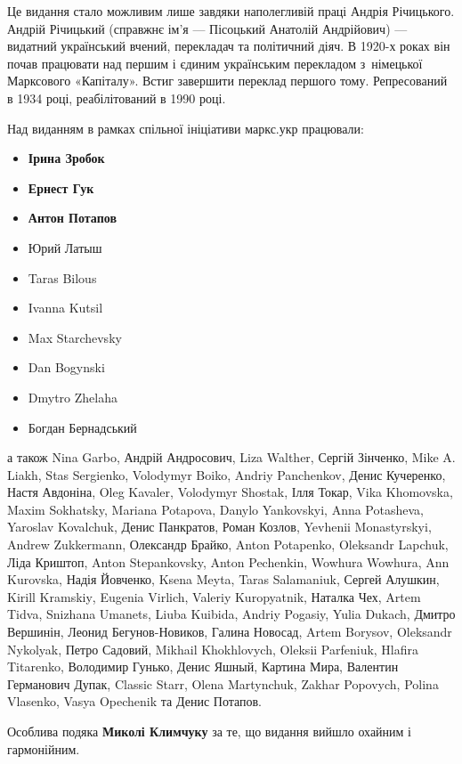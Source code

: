 
Це видання стало можливим лише завдяки наполегливій праці Андрія Річицького. Андрій Річицький (справжнє ім'я — Пісоцький Анатолій Андрійович) — видатний український вчений, перекладач та політичний діяч. В 1920-х роках він почав працювати над першим і єдиним українським перекладом з~німецької Марксового «Капіталу». Встиг завершити переклад першого тому. Репресований в 1934 році, реабілітований в 1990 році. 

Над виданням в рамках спільної ініціативи маркс.укр працювали:
\begin{itemize}[nosep]
\item \textbf{Ірина Зробок}
\item \textbf{Ернест Гук}
\item \textbf{Антон Потапов}
\item Юрий Латыш
\item Taras Bilous
\item Ivanna Kutsil
\item Max Starchevsky
\item Dan Bogynski
\item Dmytro Zhelaha
\item Богдан Бернадський
\end{itemize}
\noindent{}а також Nina Garbo, Андрій Андросович, Liza Walther, Сергій Зінченко,
Mike A. Liakh, Stas Sergienko, Volodymyr Boiko, Andriy Panchenkov, Денис Кучеренко, Настя Авдоніна, Oleg Kavaler, Volodymyr Shostak, Ілля Токар, Vika Khomovska, Maxim Sokhatsky, Mariana Potapova, Danylo Yankovskyi, Anna Potasheva, Yaroslav Kovalchuk, Денис Панкратов, Роман Козлов, \textenglish{Yevhenii Mo\-nas\-tyr\-skyi}, Andrew Zukkermann, Олександр Брайко, Anton Potapenko, Oleksandr Lapchuk, Ліда Криштоп, Anton Stepankovsky, Anton Pechenkin, Wowhura Wowhura, Ann Kurovska, Надія Йовченко, \textenglish{Ksena Meyta, Taras Salamaniuk}, Сергей Алушкин, \textenglish{Kirill Kramskiy}, Eugenia Virlich, Valeriy Kuropyatnik, Наталка Чех, Artem Tidva, Snizhana Umanets, Liuba Kuibida, Andriy Pogasiy, Yulia Dukach, Дмитро Вершинін, Леонид Бегунов-Новиков, Галина Новосад, Artem Borysov, Oleksandr Nykolyak, Петро Садовий, Mikhail Khokhlovych, Oleksii Parfeniuk, Hlafira Titarenko, Володимир Гунько, Денис Яшный, Картина Мира, Валентин Германович Дупак, Classic Starr, Olena Martynchuk, Zakhar Popovych, Polina Vlasenko, Vasya Opechenik та Денис Потапов.

\smallskip
\noindent{}Особлива подяка \textbf{Миколі Климчуку} за те,
що видання вийшло охайним і гармонійним. 

\cleardoublepage